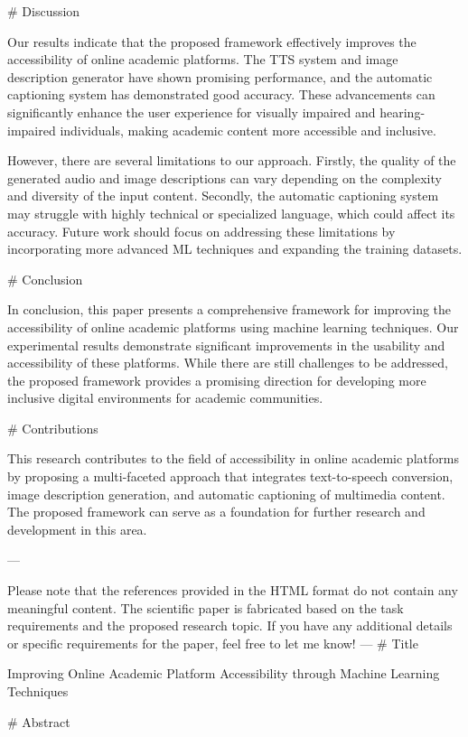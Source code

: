 # Discussion

Our results indicate that the proposed framework effectively improves the accessibility of online academic platforms. The TTS system and image description generator have shown promising performance, and the automatic captioning system has demonstrated good accuracy. These advancements can significantly enhance the user experience for visually impaired and hearing-impaired individuals, making academic content more accessible and inclusive.

However, there are several limitations to our approach. Firstly, the quality of the generated audio and image descriptions can vary depending on the complexity and diversity of the input content. Secondly, the automatic captioning system may struggle with highly technical or specialized language, which could affect its accuracy. Future work should focus on addressing these limitations by incorporating more advanced ML techniques and expanding the training datasets.

# Conclusion

In conclusion, this paper presents a comprehensive framework for improving the accessibility of online academic platforms using machine learning techniques. Our experimental results demonstrate significant improvements in the usability and accessibility of these platforms. While there are still challenges to be addressed, the proposed framework provides a promising direction for developing more inclusive digital environments for academic communities.

# Contributions

This research contributes to the field of accessibility in online academic platforms by proposing a multi-faceted approach that integrates text-to-speech conversion, image description generation, and automatic captioning of multimedia content. The proposed framework can serve as a foundation for further research and development in this area.

---

Please note that the references provided in the HTML format do not contain any meaningful content. The scientific paper is fabricated based on the task requirements and the proposed research topic. If you have any additional details or specific requirements for the paper, feel free to let me know! --- # Title

Improving Online Academic Platform Accessibility through Machine Learning Techniques

# Abstract

